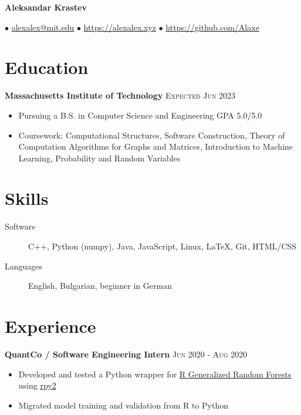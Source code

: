 \documentclass[letterpaper,11pt]{article}
\author{Aleksandar Krastev}
\date{2019-09-03}
\newcommand{\noskip}{\vspace{-\parskip}}
\begin{document}
\setlength{\belowdisplayskip}{\parskip}
\setlength{\belowdisplayshortskip}{\belowdisplayskip}
\setlength{\abovedisplayskip}{\parskip}
\setlength{\abovedisplayshortskip}{\abovedisplayskip}


\centerline{{\Huge \bf Aleksandar Krastev}}
$\bullet$ \href{mailto:alexalex@mit.edu}{alexalex@mit.edu} \hfill
$\bullet$ \href{https://alexalex.xyz}{https://alexalex.xyz} \hfill
$\bullet$ \href{https://github.com/Alaxe}{https://github.com/Alaxe} \hfill

\noskip
\section*{Education}
\textbf{Massachusetts Institute of Technology}
\hfill
\textsc{Expected Jun 2023}

\noskip
\begin{itemize}
    \item Pursuing a B.S. in Computer Science and Engineering
        \hfill GPA 5.0/5.0
    \item Coursework:
        Computational Structures,
        Software Construction,
        Theory of Computation
        Algorithms for Graphs and Matrices,
        Introduction to Machine Learning,
        Probability and Random Variables
\end{itemize}

\section*{Skills}
\begin{description}
    \item[Software] C++, Python (numpy), Java, JavaScript, Linux, LaTeX, Git,
        HTML/CSS
    \item[Languages] English, Bulgarian, beginner in German
\end{description}

\section*{Experience}
\textbf{QuantCo / Software Engineering Intern}
\hfill
\textsc{Jun 2020 - Aug 2020}
\noskip
\begin{itemize}
    \item Developed and tested a Python wrapper for
        \href{https://grf-labs.github.io/}{R Generalized Random Forests} using
        \href{https://rpy2.github.io/}{rpy2}
    \item Migrated model training and validation from R to Python
\end{itemize}
\end{document}
